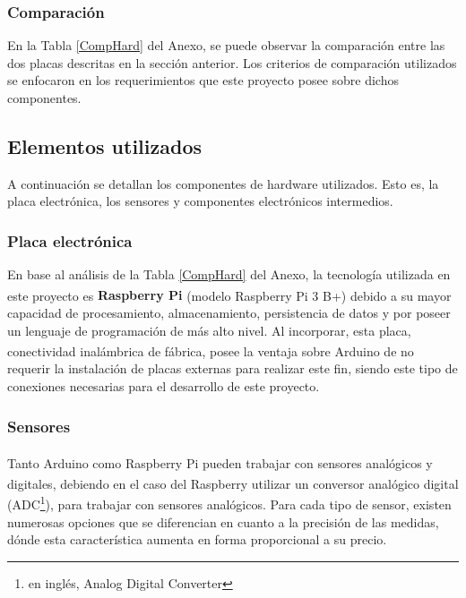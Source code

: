             \subsubsection{Comparación}
                \par En la Tabla \ref{CompHard} del Anexo, se puede observar la comparación entre las dos placas descritas en la sección anterior. Los criterios de comparación utilizados se enfocaron en los requerimientos que este proyecto posee sobre dichos componentes.
        
    \subsection{Elementos utilizados}
    \label{subseccionElementosutilizados}
        \par A continuación se detallan los componentes de hardware utilizados. Esto es, la placa electrónica, los sensores y componentes electrónicos intermedios.
        
        \subsubsection{Placa electrónica}
            \par En base al análisis de la Tabla \ref{CompHard} del Anexo, la tecnología utilizada en este proyecto es \textbf{Raspberry\textsuperscript{\textregistered} Pi} (modelo Raspberry\textsuperscript{\textregistered} Pi 3 B+) debido a su mayor capacidad de procesamiento, almacenamiento, persistencia de datos y por poseer un lenguaje de programación de más alto nivel. Al incorporar, esta placa, conectividad inalámbrica de fábrica, posee la ventaja sobre Arduino\textsuperscript{\textregistered} de no requerir la instalación de placas externas para realizar este fin, siendo este tipo de conexiones necesarias para el desarrollo de este proyecto. 

        \subsubsection{Sensores}
            \par Tanto Arduino\textsuperscript{\textregistered} como Raspberry\textsuperscript{\textregistered} Pi pueden trabajar con sensores analógicos y digitales, debiendo en el caso del Raspberry\textsuperscript{\textregistered} utilizar un conversor analógico digital (ADC\footnote{en inglés, Analog Digital Converter}), para trabajar con sensores analógicos. Para cada tipo de sensor, existen numerosas opciones que se diferencian en cuanto a la precisión de las medidas, dónde esta característica aumenta en forma proporcional a su precio.
            
